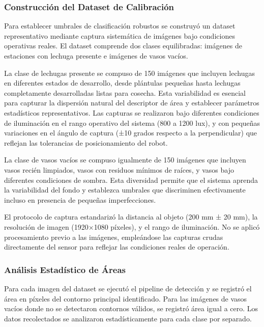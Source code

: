 \subsubsection{Construcción del Dataset de Calibración}

Para establecer umbrales de clasificación robustos se construyó un dataset representativo mediante captura sistemática de imágenes bajo condiciones operativas reales. El dataset comprende dos clases equilibradas: imágenes de estaciones con lechuga presente e imágenes de vasos vacíos.

La clase de lechugas presente se compuso de 150 imágenes que incluyen lechugas en diferentes estados de desarrollo, desde plántulas pequeñas hasta lechugas completamente desarrolladas listas para cosecha. Esta variabilidad es esencial para capturar la dispersión natural del descriptor de área y establecer parámetros estadísticos representativos. Las capturas se realizaron bajo diferentes condiciones de iluminación en el rango operativo del sistema (800 a 1200 lux), y con pequeñas variaciones en el ángulo de captura (±10 grados respecto a la perpendicular) que reflejan las tolerancias de posicionamiento del robot.

La clase de vasos vacíos se compuso igualmente de 150 imágenes que incluyen vasos recién limpiados, vasos con residuos mínimos de raíces, y vasos bajo diferentes condiciones de sombra. Esta diversidad permite que el sistema aprenda la variabilidad del fondo y establezca umbrales que discriminen efectivamente incluso en presencia de pequeñas imperfecciones.

El protocolo de captura estandarizó la distancia al objeto (200 mm ± 20 mm), la resolución de imagen (1920×1080 píxeles), y el rango de iluminación. No se aplicó procesamiento previo a las imágenes, empleándose las capturas crudas directamente del sensor para reflejar las condiciones reales de operación.

\subsubsection{Análisis Estadístico de Áreas}

Para cada imagen del dataset se ejecutó el pipeline de detección y se registró el área en píxeles del contorno principal identificado. Para las imágenes de vasos vacíos donde no se detectaron contornos válidos, se registró área igual a cero. Los datos recolectados se analizaron estadísticamente para cada clase por separado.

